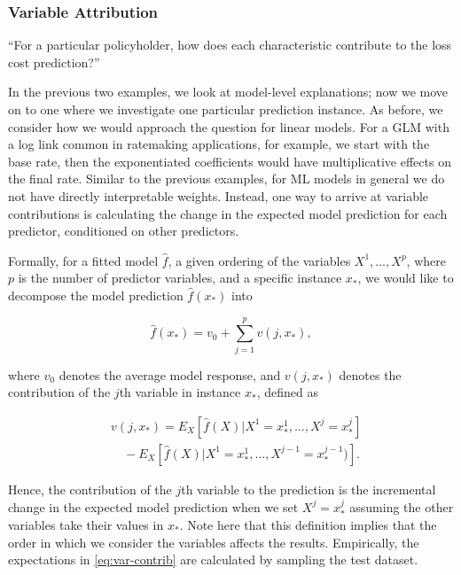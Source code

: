 \documentclass[preprint, 3p, twocolumn, letterpaper, 10pt]{elsarticle} %
\begin{document}
\hypertarget{variable-attribution}{%
\subsubsection{Variable Attribution}\label{variable-attribution}}

``For a particular policyholder, how does each characteristic contribute to the
loss cost prediction?''

In the previous two examples, we look at model-level explanations; now we
move on to one where we investigate one particular prediction instance. As
before, we consider how we would approach the question for linear models. For
a GLM with a log link common in ratemaking applications, for example, we start
with the base rate, then the exponentiated coefficients would have
multiplicative effects on the final rate. Similar to the previous examples,
for ML models in general we do not have directly interpretable weights.
Instead, one way to arrive at variable contributions is calculating the change
in the expected model prediction for each predictor, conditioned on other
predictors.

Formally, for a fitted model \(\widehat{f}\), a given ordering of the variables
\(X^1,\dots,X^p\), where \(p\) is the number of predictor variables,
and a specific instance \(x_*\), we
would like to decompose the model prediction \(\widehat{f}(x_*)\) into

\begin{equation}\label{eq:contrib-decompose}
\widehat{f}(x_* ) = v_0 + \sum_{j=1}^p v(j, x_*),
\end{equation}

where \(v_0\) denotes the average model response, and \(v(j, x_*)\) denotes the
contribution of the \(j\)th variable in instance \(x_*\), defined as

\begin{align}\label{eq:var-contrib}
& v(j, x_* ) = E_X[\widehat{f}(X) | X^1 = x_* ^1, \dots, X^j = x_* ^j] \nonumber\\
& \quad - E_X[\widehat{f}(X) | X^1 = x_* ^1, \dots, X^{j-1} = x_*^{j - 1})].
\end{align}

Hence, the contribution of the \(j\)th variable to the prediction is the
incremental change in the expected model prediction when we set \(X^j = x_*^ j\)
assuming the other variables take their values in \(x_*\). Note here that this
definition implies that the order in which we consider the variables affects
the results. Empirically, the expectations in \eqref{eq:var-contrib} are
calculated by sampling the test dataset.
\end{document}
